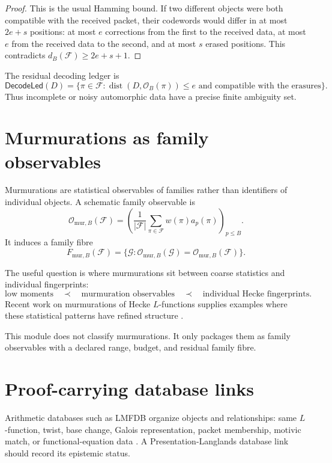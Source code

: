 \documentclass[11pt]{article}
\DeclareMathOperator{\dist}{dist}
\begin{document}
\begin{proof}
This is the usual Hamming bound.  If two different objects were both compatible with the received packet, their codewords would differ in at most \(2e+s\) positions: at most \(e\) corrections from the first to the received data, at most \(e\) from the received data to the second, and at most \(s\) erased positions.  This contradicts \(d_B(\mathcal F)\geq 2e+s+1\).
\end{proof}

The residual decoding ledger is
\[
\mathsf{DecodeLed}(D)=
\{\pi\in\mathcal F:
\dist(D,\mathcal O_B(\pi))\leq e
\text{ and compatible with the erasures}\}.
\]
Thus incomplete or noisy automorphic data have a precise finite ambiguity set.

\section{Murmurations as family observables}

Murmurations are statistical observables of families rather than identifiers of individual objects.  A schematic family observable is
\[
\mathcal O_{\mathrm{mur},B}(\mathcal F)=
\left(
\frac{1}{|\mathcal F|}
\sum_{\pi\in\mathcal F}w(\pi)a_p(\pi)
\right)_{p\leq B}.
\]
It induces a family fibre
\[
F_{\mathrm{mur},B}(\mathcal F)=
\{\mathcal G:
\mathcal O_{\mathrm{mur},B}(\mathcal G)=
\mathcal O_{\mathrm{mur},B}(\mathcal F)\}.
\]

The useful question is where murmurations sit between coarse statistics and individual fingerprints:
\[
\text{low moments}
\quad\prec\quad
\text{murmuration observables}
\quad\prec\quad
\text{individual Hecke fingerprints}.
\]
Recent work on murmurations of Hecke \(L\)-functions supplies examples where these statistical patterns have refined structure \cite{murmurations}.

This module does not classify murmurations.  It only packages them as family observables with a declared range, budget, and residual family fibre.

\section{Proof-carrying database links}

Arithmetic databases such as LMFDB organize objects and relationships: same \(L\)-function, twist, base change, Galois representation, packet membership, motivic match, or functional-equation data \cite{lmfdb}.  A Presentation-Langlands database link should record its epistemic status.
\end{document}
